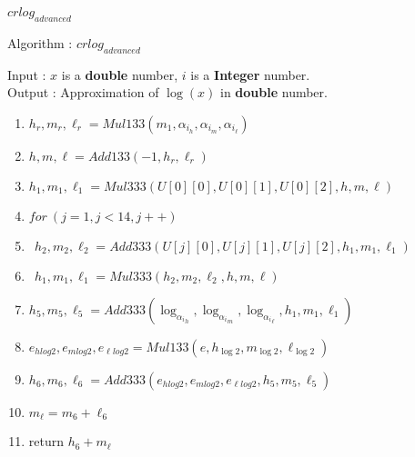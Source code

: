 \begin{frame}{$crlog_{advanced}$}
\tiny
 \begin{algo}{Algorithm : \textbf{$crlog_{advanced}$}}

 Input : $x$ is a \textbf{double} number, $i$ is a \textbf{Integer} number.\\
 Output : Approximation of $\log(x)$ in \textbf{double} number.
 \begin{enumerate}
\item $h_r,m_r,\ell_r = Mul133(m_1, \alpha_i_h,  \alpha_i_m,\alpha_i_{\ell} )$
\item $h,m,\ell = Add133(-1,h_r,\ell_r)$
\item $h_1, m_1,\ell_1 = Mul333(U[0][0], U[0][1], U[0][2],h,m,\ell)$
\item $for \ (j = 1, j<14,j++)$
\item $\ \ h_2,m_2,\ell_2 = Add333(U[j][0], U[j][1], U[j][2],h_1,m_1, \ell_1)$
\item $\ \  h_1, m_1,\ell_1 = Mul333(h_2,m_2,\ell_2,h,m,\ell)$ 
\item $h_5,m_5,\ell_5 = Add333(\log_{\alpha_i}_h,\log_{\alpha_i}_m,\log_{\alpha_i}_{\ell}, h_1, m_1,\ell_1)$
\item $e_{hlog2},e_{mlog2},e_{\ell log2} = Mul133(e, h_{\log2}, m_{\log2}, \ell_{\log2})$
\item $h_6, m_6,\ell_6 = Add333(e_{hlog2},e_{mlog2},e_{\ell log2},h_5,m_5,\ell_5)$
\item $m_{\ell} = m_6+\ell_6 $
\item return  $h_6 + m_{\ell}$
\end{enumerate}
\end{algo} 
\end{frame}

